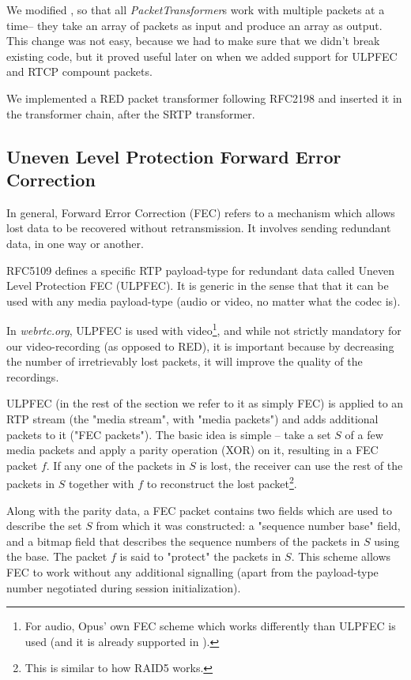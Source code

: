 \documentclass[twoside,openright,a4paper,12pt,english]{article}
\begin{document}
We modified \lj, so that all \emph{PacketTransformer}s work with multiple
packets at a time-- they take an array of packets as input and produce an array
as output. This change was not easy, because we had to make sure that we didn't
break existing code, but it proved useful later on when we added support for
ULPFEC and RTCP compount packets.

We implemented a RED packet transformer following RFC2198 and inserted it in
the transformer chain, after the SRTP transformer.




\subsection{Uneven Level Protection Forward Error Correction}
\label{ulpfec}
In general, Forward Error Correction (FEC) refers to a mechanism which allows
lost data to be recovered without retransmission. It involves sending redundant
data, in one way or another.

RFC5109\cite{ulpfec} defines a specific RTP payload-type for
redundant data called Uneven Level Protection FEC (ULPFEC). It is generic in
the sense that that it can be used with any media payload-type
(audio or video, no matter what the codec is). 

In \emph{webrtc.org},
ULPFEC is used with video\footnote{For audio, Opus' own FEC scheme which works
differently than ULPFEC is used (and it is already supported in \lj).},
and while not strictly mandatory for our video-recording (as opposed to RED),
it is important because by decreasing the number of irretrievably lost packets,
it will improve the quality of the recordings.

ULPFEC (in the rest of the section we refer to it as simply FEC) is applied to
an RTP stream (the "media stream", with "media packets")
and adds additional packets to it ("FEC packets"). The basic idea is simple --
take a set $S$ of a few media packets and apply a parity operation (XOR) on it,
resulting in a FEC packet $f$. If any one of the packets in $S$ is lost,
the receiver can use the rest of the packets in $S$ together with $f$ to reconstruct the
lost packet\footnote{This is similar to how RAID5 works.}. 

Along with the parity data, a FEC packet contains two fields which are used to
describe the set $S$ from which it was constructed: a "sequence number base"
field, and a bitmap field that describes the sequence numbers of the packets in
$S$ using the base. The packet $f$ is said to "protect" the packets in $S$. This scheme 
allows FEC to work without any additional
signalling (apart from the payload-type number negotiated during session
initialization). 
\end{document}
